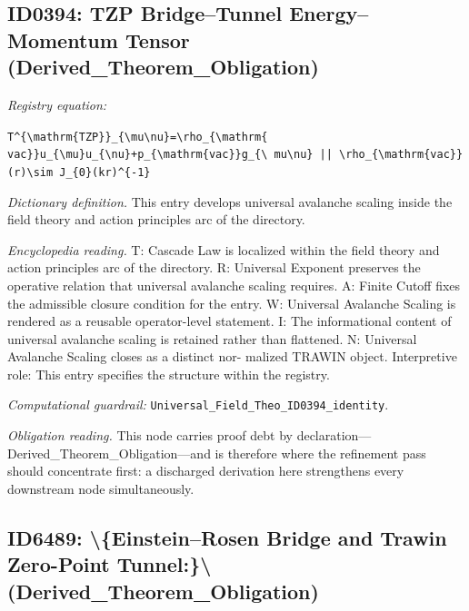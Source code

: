 \documentclass[11pt]{article}
\theoremstyle{remark}
\begin{document}
\subsection{ID0394: TZP Bridge--Tunnel Energy--Momentum Tensor (Derived\_Theorem\_Obligation)}

\noindent\textit{Registry equation:}\par
{\small\texttt{T\textasciicircum{}\{\textbackslash{}mathrm\{TZP\}\}\_\{\textbackslash{}mu\textbackslash{}nu\}=\textbackslash{}rho\_\{\textbackslash{}mathrm\{ vac\}\}u\_\{\textbackslash{}mu\}u\_\{\textbackslash{}nu\}+p\_\{\textbackslash{}mathrm\{vac\}\}g\_\{\textbackslash{} mu\textbackslash{}nu\} || \textbackslash{}rho\_\{\textbackslash{}mathrm\{vac\}\}(r)\textbackslash{}sim J\_\{0\}(kr)\textasciicircum{}\{-1\}}}\par\medskip
\noindent\textit{Dictionary definition.} This entry develops universal avalanche scaling inside the field theory and action principles arc of the directory.\par\medskip
\noindent\textit{Encyclopedia reading.} T: Cascade Law is localized within the field theory and action principles arc of the directory. R: Universal Exponent preserves the operative relation that universal avalanche scaling requires. A: Finite Cutoff fixes the admissible closure condition for the entry. W: Universal Avalanche Scaling is rendered as a reusable operator-level statement. I: The informational content of universal avalanche scaling is retained rather than flattened. N: Universal Avalanche Scaling closes as a distinct nor- malized TRAWIN object. Interpretive role: This entry specifies the structure within the registry.
\par\medskip\noindent\textit{Computational guardrail:} \texttt{Universal\_Field\_Theo\_ID0394\_identity}.
\par\medskip\noindent\textit{Obligation reading.} This node carries proof debt by declaration---Derived\_Theorem\_Obligation---and is therefore where the refinement pass should concentrate first: a discharged derivation here strengthens every downstream node simultaneously.

\subsection{ID6489: \textbackslash{}\{Einstein--Rosen Bridge and Trawin Zero-Point Tunnel:\}\textbackslash{} (Derived\_Theorem\_Obligation)}
\end{document}

